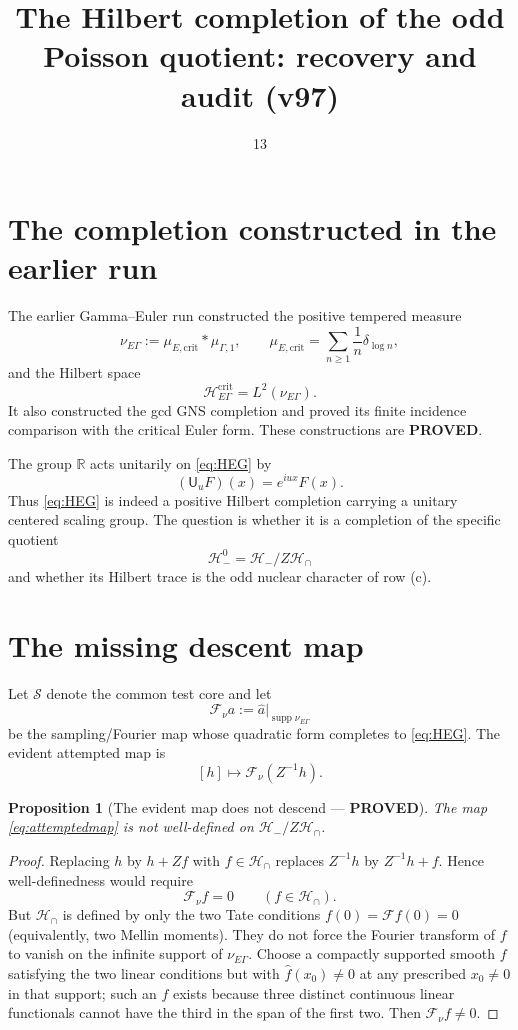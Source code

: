 \documentclass[11pt]{article}
\title{The Hilbert completion of the odd Poisson quotient: recovery and audit (v97)}
\date{13}
\newcommand{\PROVED}{\textcolor{green!40!black}{\textbf{PROVED}}}
\newtheorem{proposition}{Proposition}
\begin{document}
\maketitle

\section{The completion constructed in the earlier run}

The earlier Gamma--Euler run constructed the positive tempered measure
\[
 \nu_{E\Gamma}:=\mu_{E,\mathrm{crit}}*\mu_{\Gamma,1},
 \qquad
 \mu_{E,\mathrm{crit}}=\sum_{n\ge1}\frac1n\delta_{\log n},
\]
and the Hilbert space
\begin{equation}\label{eq:HEG}
 \mathscr H_{E\Gamma}^{\mathrm{crit}}=L^2(\nu_{E\Gamma}).
\end{equation}
It also constructed the gcd GNS completion and proved its finite incidence
comparison with the critical Euler form.  These constructions are \PROVED.

The group $\mathbb R$ acts unitarily on \eqref{eq:HEG} by
\[
 (\mathsf U_uF)(x)=e^{iux}F(x).
\]
Thus \eqref{eq:HEG} is indeed a positive Hilbert completion carrying a
unitary centered scaling group.  The question is whether it is a completion
of the specific quotient
\[
 \mathcal H_-^0=\mathcal H_-/Z\mathcal H_\cap
\]
and whether its Hilbert trace is the odd nuclear character of row (c).

\section{The missing descent map}

Let $\mathcal S$ denote the common test core and let
\[
 \mathcal F_\nu a:=\widehat a\big|_{\operatorname{supp}\nu_{E\Gamma}}
\]
be the sampling/Fourier map whose quadratic form completes to
\eqref{eq:HEG}.  The evident attempted map is
\begin{equation}\label{eq:attemptedmap}
 [h]\longmapsto \mathcal F_\nu(Z^{-1}h).
\end{equation}

\begin{proposition}[The evident map does not descend --- \PROVED]
The map \eqref{eq:attemptedmap} is not well-defined on
$\mathcal H_-/Z\mathcal H_\cap$.
\end{proposition}

\begin{proof}
Replacing $h$ by $h+Zf$ with $f\in\mathcal H_\cap$ replaces
$Z^{-1}h$ by $Z^{-1}h+f$.  Hence well-definedness would require
\[
 \mathcal F_\nu f=0\qquad(f\in\mathcal H_\cap).
\]
But $\mathcal H_\cap$ is defined by only the two Tate conditions
$f(0)=\mathcal Ff(0)=0$ (equivalently, two Mellin moments).  They do not
force the Fourier transform of $f$ to vanish on the infinite support of
$\nu_{E\Gamma}$.  Choose a compactly supported smooth $f$ satisfying the two
linear conditions but with $\widehat f(x_0)\ne0$ at any prescribed
$x_0\ne0$ in that support; such an $f$ exists because three distinct
continuous linear functionals cannot have the third in the span of the first
two.  Then $\mathcal F_\nu f\ne0$.
\end{proof}
\end{document}

